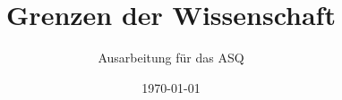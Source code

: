 \documentclass[userip,ngerman,cpalette=Peach]{lecture-fancy-paper}
\title{Grenzen der Wissenschaft}%
\subtitle{Ausarbeitung für das ASQ \say{20\textsuperscript{th} century thinking about science}}
\date{\today}
\begin{document}
\maketitle

\blinddocument
\end{document}
